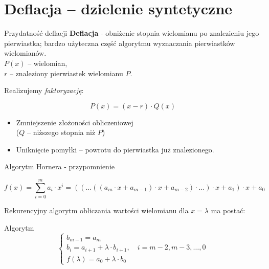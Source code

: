 \section{Deflacja -- dzielenie syntetyczne}
\begin{frame}{Przydatność deflacji}
\textbf{Deflacja} - obniżenie stopnia wielomianu po znalezieniu jego pierwiastka; bardzo użyteczna część algorytmu wyznaczania pierwiastków wielomianów. \\

$P(x)$ -- wielomian,\\
  $r$ -- znaleziony pierwiastek wielomianu $P$.

  Realizujemy \textit{faktoryzację}:
  \begin{block}{}
    $$ P(x) = (x - r) \cdot Q(x) $$
  \end{block}

  \begin{itemize}
    \item Zmniejszenie złożoności obliczeniowej\\
     ($Q$ -- niższego stopnia niż $P$)
    \item Uniknięcie pomyłki -- powrotu do pierwiastka już znalezionego.
  \end{itemize}
\end{frame}
\begin{frame}{Algorytm Hornera - przypomnienie}
  \begin{block}
    $$ f(x) = \sum_{i=0}^m a_i \cdot x^i = ( ( \dots (( a_m \cdot x + a_{m-1}) \cdot x + a_{m-2} ) \cdot \dots) \cdot x + a_1) \cdot x + a_0 $$
  \end{block}

  Rekurencyjny algorytm obliczania wartości wielomianu dla $x = \lambda$ ma postać:

  \begin{block}{Algorytm}
    $$ \left \{ \begin{array}{l}
    b_{m-1} = a_m \\
    b_i = a_{i+1} + \lambda \cdot b_{i+1}, \quad i = m - 2, m-3, \dots, 0 \\
    f( \lambda ) = a_{0} + \lambda \cdot b_{0}
    \end{array} \right. $$
  \end{block}
\end{frame}


